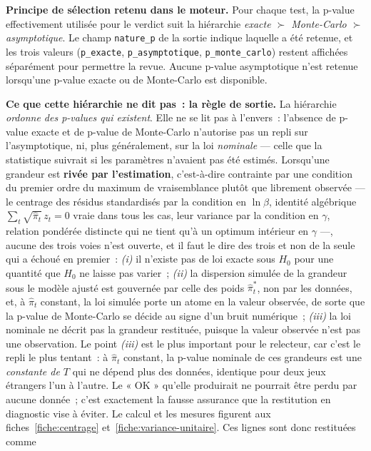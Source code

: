 \documentclass[a4paper,11pt]{article}
\newcommand{\code}[1]{\texttt{\small #1}}
\begin{document}
\medskip
\begin{encadre}
\textbf{Principe de sélection retenu dans le moteur.} Pour chaque test, la
p-value effectivement utilisée pour le verdict suit la hiérarchie
\emph{exacte $\succ$ Monte-Carlo $\succ$ asymptotique}. Le champ \code{nature\_p}
de la sortie indique laquelle a été retenue, et les trois valeurs
(\code{p\_exacte}, \code{p\_asymptotique}, \code{p\_monte\_carlo}) restent
affichées séparément pour permettre la revue. Aucune p-value asymptotique n'est
retenue lorsqu'une p-value exacte ou de Monte-Carlo est disponible.

\medskip
\textbf{Ce que cette hiérarchie ne dit pas~: la règle de sortie.} La hiérarchie
\emph{ordonne des p-values qui existent}. Elle ne se lit pas à l'envers~:
l'absence de p-value exacte et de p-value de Monte-Carlo n'autorise pas un
repli sur l'asymptotique, ni, plus généralement, sur la loi \emph{nominale}
--- celle que la statistique suivrait si les paramètres n'avaient pas été
estimés. Lorsqu'une grandeur est \textbf{rivée par l'estimation}, c'est-à-dire
contrainte par une condition du premier ordre du maximum de vraisemblance plutôt
que librement observée --- le centrage des résidus standardisés par la
condition en $\ln\beta$, identité algébrique $\sum_t\sqrt{\hat\pi_t}\,z_t = 0$
vraie dans tous les cas, leur variance par la condition en $\gamma$, relation
pondérée distincte qui ne tient qu'à un optimum intérieur en $\gamma$ ---,
aucune des trois voies n'est ouverte, et il faut le
dire des trois et non de la seule qui a échoué en premier~: \emph{(i)} il
n'existe pas de loi exacte sous $H_0$ pour une quantité que $H_0$ ne laisse pas
varier~; \emph{(ii)} la dispersion simulée de la grandeur sous le modèle ajusté
est gouvernée par celle des poids $\hat\pi_t^{*}$, non par les données, et, à
$\hat\pi_t$ constant, la loi simulée porte un atome en la valeur observée, de
sorte que la p-value de Monte-Carlo se décide au signe d'un
bruit numérique~; \emph{(iii)} la loi nominale ne décrit pas la grandeur
restituée, puisque la valeur observée n'est pas une observation. Le point
\emph{(iii)} est le plus important pour le relecteur, car c'est le repli le
plus tentant~: à $\hat\pi_t$ constant, la p-value nominale de ces grandeurs est
une \emph{constante de $T$} qui ne dépend plus des données, identique pour deux
jeux étrangers l'un à l'autre. Le « OK » qu'elle produirait ne pourrait être
perdu par aucune donnée~; c'est exactement la fausse assurance que la
restitution en diagnostic vise à éviter. Le calcul et les mesures figurent aux
fiches~\ref{fiche:centrage} et~\ref{fiche:variance-unitaire}. Ces lignes sont donc restituées comme

\end{encadre}
\end{document}
